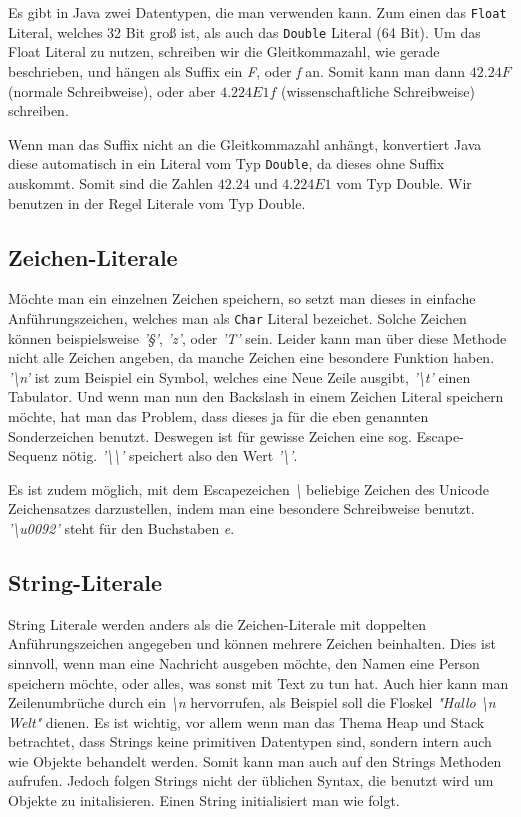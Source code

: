 Es gibt in Java zwei Datentypen, die man verwenden kann. Zum einen das \texttt{Float} Literal, welches 32 Bit groß ist, als auch das \texttt{Double} Literal (64 Bit). Um das Float Literal zu nutzen, schreiben wir die Gleitkommazahl, wie gerade beschrieben, und hängen als Suffix ein \textit{F}, oder \textit{f} an. Somit kann man dann $42.24F$ (normale Schreibweise), oder aber $4.224E1f$ (wissenschaftliche Schreibweise) schreiben.

Wenn man das Suffix nicht an die Gleitkommazahl anhängt, konvertiert Java diese automatisch in ein Literal vom Typ \texttt{Double}, da dieses ohne Suffix auskommt. Somit sind die Zahlen $42.24$ und $4.224E1$ vom Typ Double. Wir benutzen in der Regel Literale vom Typ Double.

\subsection{Zeichen-Literale}

Möchte man ein einzelnen Zeichen speichern, so setzt man dieses in einfache Anführungszeichen, welches man als \texttt{Char} Literal bezeichet. Solche Zeichen können beispielsweise \textit{'§'}, \textit{'z'}, oder \textit{'T'} sein. Leider kann man über diese Methode nicht alle Zeichen angeben, da manche Zeichen eine besondere Funktion haben. \textit{'\textbackslash n'} ist zum Beispiel ein Symbol, welches eine Neue Zeile ausgibt, \textit{'\textbackslash t'} einen Tabulator. Und wenn man nun den Backslash in einem Zeichen Literal speichern möchte, hat man das Problem, dass dieses ja für die eben genannten Sonderzeichen benutzt. Deswegen ist für gewisse Zeichen eine sog. Escape-Sequenz nötig. \textit{'\textbackslash \textbackslash'} speichert also den Wert \textit{'\textbackslash'}.

Es ist zudem möglich, mit dem Escapezeichen \textit{\textbackslash} beliebige Zeichen des Unicode Zeichensatzes darzustellen, indem man eine besondere Schreibweise benutzt. \textit{'\textbackslash u0092'} steht für den Buchstaben \textit{e}.

\subsection{String-Literale}

String Literale werden anders als die Zeichen-Literale mit doppelten Anführungszeichen angegeben und können mehrere Zeichen beinhalten. Dies ist sinnvoll, wenn man eine Nachricht ausgeben möchte, den Namen eine Person speichern möchte, oder alles, was sonst mit Text zu tun hat. Auch hier kann man Zeilenumbrüche durch ein \textit{\textbackslash n} hervorrufen, als Beispiel soll die Floskel \textit{"Hallo \textbackslash n Welt"} dienen.
Es ist wichtig, vor allem wenn man das Thema Heap und Stack betrachtet, dass Strings keine primitiven Datentypen sind, sondern intern auch wie Objekte behandelt werden. Somit kann man auch auf den Strings Methoden aufrufen. Jedoch folgen Strings nicht der üblichen Syntax, die benutzt wird um Objekte zu initalisieren. Einen String initialisiert man wie folgt.

